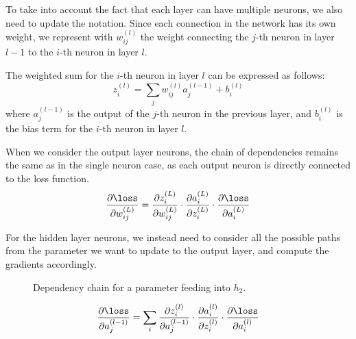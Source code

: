 To take into account the fact that each layer can have multiple neurons, we also need to update the notation. Since each connection in the network has its own weight,
we represent with $w_{ij}^{(l)}$ the weight connecting the $j$-th neuron in layer $l-1$ to the $i$-th neuron in layer $l$.

The weighted sum for the $i$-th neuron in layer $l$ can be expressed as follows:
\begin{equation*}
    z_i^{(l)} = \sum_{j} w_{ij}^{(l)} a_j^{(l-1)} + b_i^{(l)}
\end{equation*}
where $a_j^{(l-1)}$ is the output of the $j$-th neuron in the previous layer, and $b_i^{(l)}$ is the bias term for the $i$-th neuron in layer $l$.

When we consider the output layer neurons, the chain of dependencies remains the same as in the single neuron case, as each output neuron is directly connected to the loss function.
\begin{equation*}
    \frac{\partial \loss}{\partial w_{ij}^{(L)}} = \frac{\partial z_i^{(L)}}{\partial w_{ij}^{(L)}} \cdot \frac{\partial a_i^{(L)}}{\partial z_i^{(L)}} \cdot \frac{\partial \loss}{\partial a_i^{(L)}}
\end{equation*}

For the hidden layer neurons, we instead need to consider all the possible paths from the parameter we want to update to the output layer, and compute the gradients accordingly.
\begin{figure}[H]
    \centering
    \scalebox{0.5}{}
    \caption{Dependency chain for a parameter feeding into $h_2$.}
    \label{fig:backpropagation_output}
\end{figure}
\begin{equation*}
    \frac{\partial \loss}{\partial a_j^{(l-1)}} = \sum_{i} \frac{\partial z_i^{(l)}}{\partial a_j^{(l-1)}} \cdot \frac{\partial a_i^{(l)}}{\partial z_i^{(l)}} \cdot \frac{\partial \loss}{\partial a_i^{(l)}}
\end{equation*}